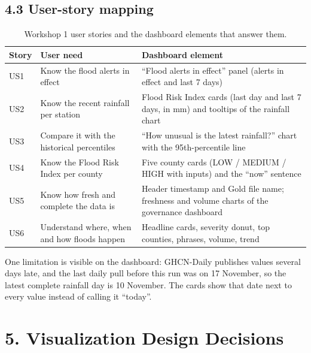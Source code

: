 \documentclass[stu, 12pt, letterpaper, donotrepeattitle, floatsintext, natbib]{apa7}
\begin{document}
\subsection{4.3 User-story mapping}
\begin{table}[H]
\centering
\scriptsize
\caption{Workshop 1 user stories and the dashboard elements that answer them.}
\label{tab:user-stories}
\begin{tabularx}{\textwidth}{>{\raggedright\arraybackslash}p{1.0cm} >{\raggedright\arraybackslash}p{4.4cm} >{\raggedright\arraybackslash}X}
\toprule
\textbf{Story} & \textbf{User need} & \textbf{Dashboard element} \\
\midrule
US1 & Know the flood alerts in effect & ``Flood alerts in effect'' panel (alerts in effect and last 7 days) \\
US2 & Know the recent rainfall per station & Flood Risk Index cards (last day and last 7 days, in mm) and tooltips of the rainfall chart \\
US3 & Compare it with the historical percentiles & ``How unusual is the latest rainfall?'' chart with the 95th-percentile line \\
US4 & Know the Flood Risk Index per county & Five county cards (LOW / MEDIUM / HIGH with inputs) and the ``now'' sentence \\
US5 & Know how fresh and complete the data is & Header timestamp and Gold file name; freshness and volume charts of the governance dashboard \\
US6 & Understand where, when and how floods happen & Headline cards, severity donut, top counties, phrases, volume, trend \\
\bottomrule
\end{tabularx}
\end{table}

\noindent One limitation is visible on the dashboard: GHCN-Daily publishes values several days late, and the last daily pull before this run was on 17 November, so the latest complete rainfall day is 10 November. The cards show that date next to every value instead of calling it ``today''.

\section{\large 5. Visualization Design Decisions}
\end{document}
